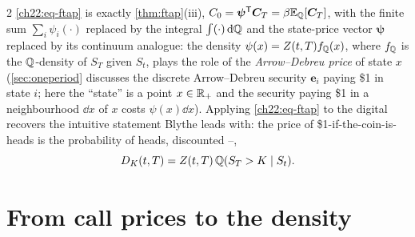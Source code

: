 \begin{paracol}{2}
\eqref{ch22:eq-ftap} is exactly \cref{thm:ftap}(iii), $C_0=\bm\psi^{\mathsf T}\bm C_T=\beta\mathbb{E}_{\mathbb{Q}}[\bm C_T]$, with
the finite sum $\sum_i\psi_i(\cdot)$ replaced by the integral $\int(\cdot)\,\mathrm{d}\mathbb{Q}$ and the state-price
vector $\bm\psi$ replaced by its continuum analogue: the density $\psi(x)=Z(t,T)f_{\mathbb{Q}}(x)$, where
$f_{\mathbb{Q}}$ is the $\mathbb{Q}$-density of $S_T$ given $S_t$, plays the role of the \emph{Arrow--Debreu price} of
state $x$ (\cref{sec:oneperiod} discusses the discrete Arrow--Debreu security $\bm e_i$ paying
\$1 in state $i$; here the ``state'' is a point $x\in\mathbb{R}_+$ and the security paying \$1 in a
neighbourhood $\dd x$ of $x$ costs $\psi(x)\dd x$). Applying \eqref{ch22:eq-ftap} to the digital
recovers the intuitive statement Blythe leads with: the price of \$1-if-the-coin-is-heads is the
probability of heads, discounted --,
\begin{equation}\label{ch22:eq-digital-ftap}
  D_K(t,T) = Z(t,T)\,\mathbb{Q}(S_T>K\mid S_t).
\end{equation}

\section{From call prices to the density}\label{ch22:sec-bl-recap}


\end{paracol}
